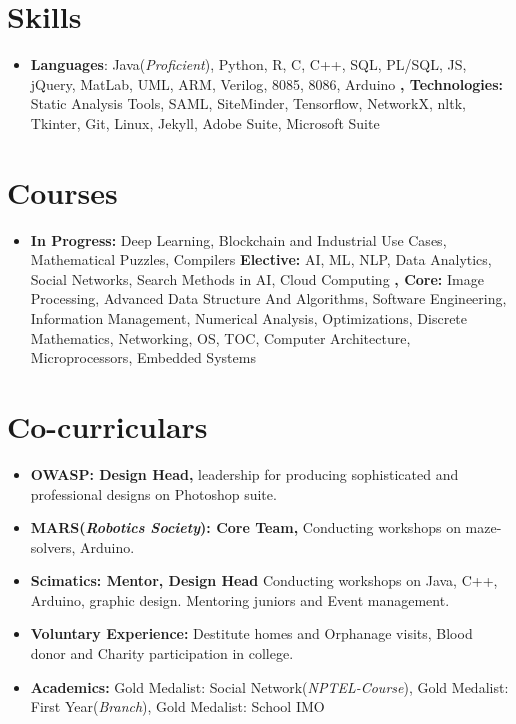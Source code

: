 \documentclass[letterpaper,10pt]{article}
\newcommand{\resumeSubHeadingListStart}{\begin{itemize}[leftmargin=*]}
\newcommand{\resumeSubHeadingListEnd}{\end{itemize}}
\begin{document}
\section{Skills}
  \resumeSubHeadingListStart
    \item{
      \textbf{Languages}{: Java}{(\textit{Proficient})}{,}{ Python}{,}{ R}{,}{ C}{,}{ C++}{,}{ SQL}{,}{ PL/SQL}{,}{ JS}{,}{ jQuery}{,}{ MatLab}{,}{ UML}{,}{ ARM}{,}{ Verilog}{,}{ 8085}{,}{ 8086}{,}{ Arduino}
      \textbf{, Technologies: }{ Static Analysis Tools}{,}{ SAML}{,}{ SiteMinder}{,}{ Tensorflow}{,}{ NetworkX}{,}{ nltk}{,}{ Tkinter}{,}{ Git}{,}{ Linux}{,}{ Jekyll}{,}{ Adobe Suite}{,}{ Microsoft Suite}
    }
  \resumeSubHeadingListEnd

\section{Courses}
  \resumeSubHeadingListStart
    \item{
      \textbf{In Progress:}{ Deep Learning}{,}{ Blockchain and Industrial Use Cases}{,}{ Mathematical Puzzles}{,}{ Compilers}
      \textbf{Elective:}{ AI}{,}{ ML}{,}{ NLP}{,}{ Data Analytics}{,}{ Social Networks}{,}{ Search Methods in AI}{,}{ Cloud Computing}
      \textbf{, Core:}{ Image Processing}{,}{ Advanced Data Structure And Algorithms}{,}{ Software Engineering}{,}{ Information Management}{,}{ Numerical Analysis}{,}{ Optimizations}{,}{ Discrete Mathematics}{,}{ Networking}{,}{ OS}{,}{ TOC}{,}{ Computer Architecture}{,}{ Microprocessors}{,}{ Embedded Systems}   
         }
  \resumeSubHeadingListEnd

\section{Co-curriculars}
  \resumeSubHeadingListStart
    \item{
      \textbf{OWASP: Design Head, }{leadership for producing sophisticated and professional designs on Photoshop suite.}
         }
    \item{
      \textbf{MARS(\textit{Robotics Society}): Core Team, }{Conducting workshops on maze-solvers, Arduino.}
         }
    \item{
      \textbf{Scimatics: Mentor, Design Head }{Conducting workshops on Java, C++, Arduino, graphic design. Mentoring juniors and Event management.}
         }
    \item{
      \textbf{Voluntary Experience: }{Destitute homes and Orphanage visits, Blood donor and Charity participation in college.}
         }         
\item{
      \textbf{Academics: }{Gold Medalist: Social Network(\textit{NPTEL-Course}), Gold Medalist: First Year(\textit{Branch}), Gold Medalist: School IMO}
         }         

  \resumeSubHeadingListEnd

\end{document}
